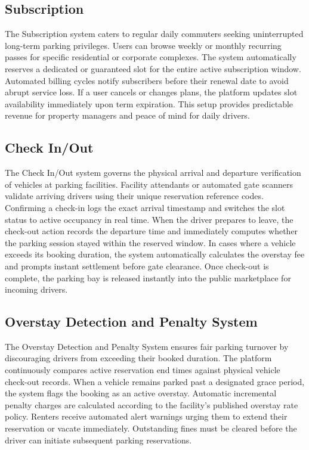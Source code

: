 \documentclass[12pt,a4paper]{article}
\begin{document}
\subsection{Subscription}
The Subscription system caters to regular daily commuters seeking uninterrupted long-term parking privileges. Users can browse weekly or monthly recurring passes for specific residential or corporate complexes. The system automatically reserves a dedicated or guaranteed slot for the entire active subscription window. Automated billing cycles notify subscribers before their renewal date to avoid abrupt service loss. If a user cancels or changes plans, the platform updates slot availability immediately upon term expiration. This setup provides predictable revenue for property managers and peace of mind for daily drivers.

\subsection{Check In/Out}
The Check In/Out system governs the physical arrival and departure verification of vehicles at parking facilities. Facility attendants or automated gate scanners validate arriving drivers using their unique reservation reference codes. Confirming a check-in logs the exact arrival timestamp and switches the slot status to active occupancy in real time. When the driver prepares to leave, the check-out action records the departure time and immediately computes whether the parking session stayed within the reserved window. In cases where a vehicle exceeds its booking duration, the system automatically calculates the overstay fee and prompts instant settlement before gate clearance. Once check-out is complete, the parking bay is released instantly into the public marketplace for incoming drivers.

\subsection{Overstay Detection and Penalty System}
The Overstay Detection and Penalty System ensures fair parking turnover by discouraging drivers from exceeding their booked duration. The platform continuously compares active reservation end times against physical vehicle check-out records. When a vehicle remains parked past a designated grace period, the system flags the booking as an active overstay. Automatic incremental penalty charges are calculated according to the facility's published overstay rate policy. Renters receive automated alert warnings urging them to extend their reservation or vacate immediately. Outstanding fines must be cleared before the driver can initiate subsequent parking reservations.
\end{document}
